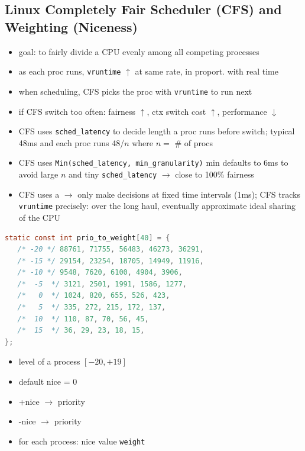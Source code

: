 \documentclass[8pt,a4paper,landscape]{extarticle}
\begin{document}
\begin{multicols*}{3}
\section*{Linux Completely Fair Scheduler (CFS) and Weighting (Niceness)}
\begin{itemize}
\item goal: to fairly divide a CPU evenly among all competing processes
\item as each proc runs, \texttt{vruntime} $\uparrow$ at same rate, in proport.
with real time
\item when scheduling, CFS picks the proc with  \texttt{vruntime} to run next
\item if CFS switch too often: fairness $\uparrow$, ctx switch cost $\uparrow$, performance $\downarrow$
\item CFS uses \texttt{sched\_latency} to decide length a proc runs before switch; typical 48ms and each proc runs 48/$n$ where $n=$ \# of procs
\item CFS uses \texttt{Min(sched\_latency, min\_granularity)} min defaults to 6ms to avoid large $n$ and tiny \texttt{sched\_latency} $\to$ close to 100\% fairness
\item CFS uses a  $\to$ only make decisions at fixed time intervals (1ms); CFS tracks \texttt{vruntime} precisely: over the long haul, eventually approximate ideal sharing of the CPU
\end{itemize}
\begin{minipage}{.66\linewidth}
\begin{lstlisting}[language=c]
static const int prio_to_weight[40] = {
   /* -20 */ 88761, 71755, 56483, 46273, 36291,
   /* -15 */ 29154, 23254, 18705, 14949, 11916,
   /* -10 */ 9548, 7620, 6100, 4904, 3906,
   /*  -5  */ 3121, 2501, 1991, 1586, 1277,
   /*   0  */ 1024, 820, 655, 526, 423,
   /*   5  */ 335, 272, 215, 172, 137,
   /*  10  */ 110, 87, 70, 56, 45,
   /*  15  */ 36, 29, 23, 18, 15,
};
\end{lstlisting}
\end{minipage}
\begin{minipage}{.34\linewidth}
  \flushleft
  \begin{itemize}
  \item {} level of a process $[-20, +19]$
  \item default nice = 0
  \item +nice $\to$  priority
  \item -nice $\to$  priority
  \item for each process: nice value  \texttt{weight}

\end{itemize}
\end{minipage}
\end{multicols*}
\end{document}
